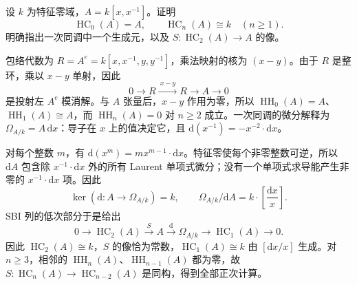 \begin{optionalexercise}\label{b4:ex:cyclic-laurent-polynomials}
	设 \(k\) 为特征零域，\(A=k[x,x^{-1}]\)。证明
	\[
		\operatorname{HC}_0(A)=A,\qquad
		\operatorname{HC}_n(A)\cong k\quad(n\ge1).
	\]
	明确指出一次同调中一个生成元，以及 \(S:\operatorname{HC}_2(A)\to A\) 的像。
\end{optionalexercise}
\begin{solution}
	包络代数为 \(R=A^e=k[x,x^{-1},y,y^{-1}]\)，乘法映射的核为 \((x-y)\)。由于 \(R\) 是整环，乘以 \(x-y\) 单射，因此
	\[
		0\longrightarrow R\xrightarrow{\ x-y\ }R\longrightarrow A\longrightarrow0
	\]
	是投射左 \(A^e\) 模消解。与 \(A\) 张量后，\(x-y\) 作用为零，所以 \(\operatorname{HH}_0(A)=A\)、\(\operatorname{HH}_1(A)\cong A\)，而 \(\operatorname{HH}_n(A)=0\) 对 \(n\ge2\) 成立。一次同调的微分解释为 \(\Omega_{A/k}=A\,\mathrm d x\)：导子在 \(x\) 上的值决定它，且 \(\mathrm d(x^{-1})=-x^{-2}\cdot\mathrm d x\)。

	对每个整数 \(m\)，有 \(\mathrm d(x^m)=m x^{m-1}\cdot\mathrm d x\)。特征零使每个非零整数可逆，所以 \(\mathrm dA\) 包含除 \(x^{-1}\cdot\mathrm d x\) 外的所有 Laurent 单项式微分；没有一个单项式求导能产生非零的 \(x^{-1}\cdot\mathrm d x\) 项。因此
	\[
		\ker(\mathrm d:A\to\Omega_{A/k})=k,\qquad
		\Omega_{A/k}/\mathrm dA=k\cdot\left[\frac{\mathrm d x}{x}\right].
	\]
	SBI 列的低次部分于是给出
	\[
		0\longrightarrow\operatorname{HC}_2(A)\xrightarrow{S}A
		\xrightarrow{\mathrm d}\Omega_{A/k}
		\longrightarrow\operatorname{HC}_1(A)\longrightarrow0.
	\]
	因此 \(\operatorname{HC}_2(A)\cong k\)，\(S\) 的像恰为常数，\(\operatorname{HC}_1(A)\cong k\) 由 \([\mathrm d x/x]\) 生成。对 \(n\ge3\)，相邻的 \(\operatorname{HH}_n(A)\)、\(\operatorname{HH}_{n-1}(A)\) 都为零，故 \(S:\operatorname{HC}_n(A)\to\operatorname{HC}_{n-2}(A)\) 是同构，得到全部正次计算。
\end{solution}

